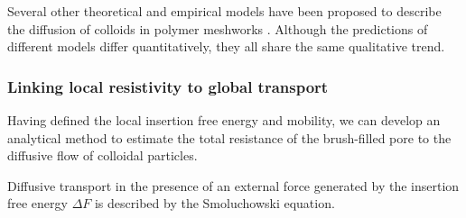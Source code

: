\documentclass[12pt, a4paper]{article}
\begin{document}
Several other theoretical and empirical models have been proposed to describe the diffusion of colloids in polymer meshworks \cite{Schweizer2003,Kohli2012,Holyst2009,Phillies1988}.
Although the predictions of different models differ quantitatively, they all share the same qualitative trend.



\subsubsection{Linking local resistivity to global transport}


Having defined the local insertion free energy and mobility, we can develop an analytical method to estimate the total resistance of the brush-filled pore to the diffusive flow of colloidal particles.

Diffusive transport in the presence of an external force generated by the insertion free energy $\Delta F$ is described by the Smoluchowski equation.
\end{document}
